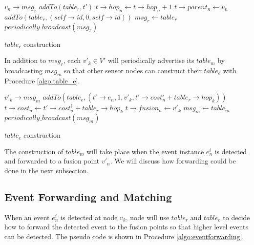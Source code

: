 \begin{algorithm}
\begin{algorithmic}
\REQUIRE \(v_n\rightarrow msg_r\)
			\STATE \(addTo(table_r, t')\)
		\ENDIF
					\STATE \(t\rightarrow hop_n \gets t\rightarrow hop_n+1\)
					\STATE \(t\rightarrow parent_n \gets v_n\)
				\ENDIF
			\ENDIF
		\ENDFOR
	\ENDFOR
		\STATE \(addTo(table_r, (self\rightarrow id, 0, self\rightarrow id))\)
	\ENDIF
	\STATE \(msg_r \gets table_r\)
	\STATE \(periodically\_broadcast(msg_r)\)
\end{algorithmic}
\caption{\(table_r\) construction}
\label{algo:table_r}
\end{algorithm}

In addition to \(msg_r\), each \(v'_k\in V'\) will periodically advertise its \(table_m\) by broadcasting \(msg_m\) so that other sensor nodes can construct their \(table_e\) with Procedure \ref{algo:table_e}.

\begin{algorithm}
\begin{algorithmic}
\REQUIRE \(v'_k\rightarrow msg_m\)
			\STATE \(addTo(table_e, (t'\rightarrow e_n, 1, v'_k, t'\rightarrow cost_n^i+table_r\rightarrow hop_k))\)
		\ENDIF
					\STATE \(t\rightarrow cost_n \gets t'\rightarrow cost_n^i+table_r\rightarrow hop_k\)
					\STATE \(t\rightarrow fusion_n \gets v'_k\)
				\ENDIF
			\ENDIF
		\ENDFOR
	\ENDFOR
		\STATE \(msg_m \gets table_m\)
		\STATE \(periodically\_broadcast(msg_m)\)
	\ENDIF
\end{algorithmic}
\caption{\(table_e\) construction}
\label{algo:table_e}
\end{algorithm}

The construction of \(table_m\) will take place when the event instance \(e_n^i\) is detected and forwarded to a fusion point \(v'_n\). We will discuss how forwarding could be done in the next subsection.

\subsection{Event Forwarding and Matching}
When an event \(e_n^i\) is detected at node \(v_k\), node will use \(table_r\) and \(table_e\) to decide how to forward the detected event to the fusion points so that higher level events can be detected. The pseudo code is shown in Procedure \ref{algo:eventforwarding}.

